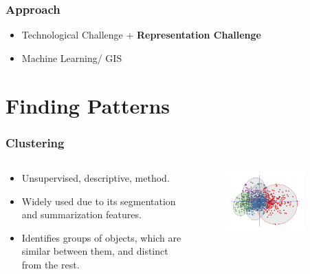 \documentclass[hyperref={pdfpagelabels=true}]{beamer}
\begin{document}
\begin{frame}
\frametitle{Approach}
      \begin{itemize}    
	    \item<1->Technological Challenge + \textbf{Representation Challenge}
	    \item<1->Machine Learning/ GIS     
      \end{itemize}                
\end{frame}


\section{Finding Patterns} 
\begin{frame}
\frametitle{Clustering}
\begin{columns}
  \begin{column}{0.5\textwidth}\small{ 
    \begin{itemize}
      \item<1->Unsupervised, descriptive, method.    
      \item<1->Widely used due to its segmentation and summarization features.
      \item<1->Identifies groups of objects, which are similar between them, and distinct from the rest.
      \end{itemize}  }
  \end{column}
  \begin{column}{0.5\textwidth}
      \begin{figure}  
	\includegraphics[width=0.8\textwidth]{Cluster_analysis.png}
       \end{figure}  
  \end{column}  
\end{columns}
\end{frame}
\end{document}
